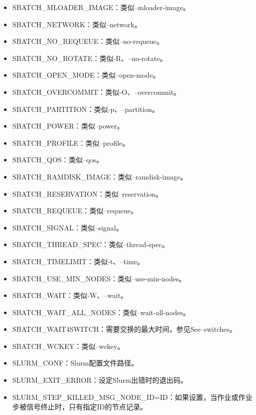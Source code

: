 \begin{itemize}
	\item SBATCH\_MLOADER\_IMAGE：类似--mloader-image。
	\item SBATCH\_NETWORK：类似--network。
	\item SBATCH\_NO\_REQUEUE：类似--no-requeue。
	\item SBATCH\_NO\_ROTATE：类似-R、--no-rotate。
	\item SBATCH\_OPEN\_MODE：类似--open-mode。
	\item SBATCH\_OVERCOMMIT：类似-O、--overcommit。
	\item SBATCH\_PARTITION：类似-p、--partition。
	\item SBATCH\_POWER：类似--power。
	\item SBATCH\_PROFILE：类似--profile。
	\item SBATCH\_QOS：类似--qos。
	\item SBATCH\_RAMDISK\_IMAGE：类似--ramdisk-image。
	\item SBATCH\_RESERVATION：类似--reservation。
	\item SBATCH\_REQUEUE：类似--requeue。
	\item SBATCH\_SIGNAL：类似--signal。
	\item SBATCH\_THREAD\_SPEC：类似--thread-spec。
	\item SBATCH\_TIMELIMIT：类似-t、--time。
	\item SBATCH\_USE\_MIN\_NODES：类似--use-min-nodes。
	\item SBATCH\_WAIT：类似-W、--wait。
	\item SBATCH\_WAIT\_ALL\_NODES：类似--wait-all-nodes。
	\item SBATCH\_WAIT4SWITCH：需要交换的最大时间，参见See--switches。
	\item SBATCH\_WCKEY：类似--wckey。
	\item SLURM\_CONF：Slurm配置文件路径。
	\item SLURM\_EXIT\_ERROR：设定Slurm出错时的退出码。
	\item SLURM\_STEP\_KILLED\_MSG\_NODE\_ID=ID：如果设置，当作业或作业步被信号终止时，只有指定ID的节点记录。
\end{itemize}

